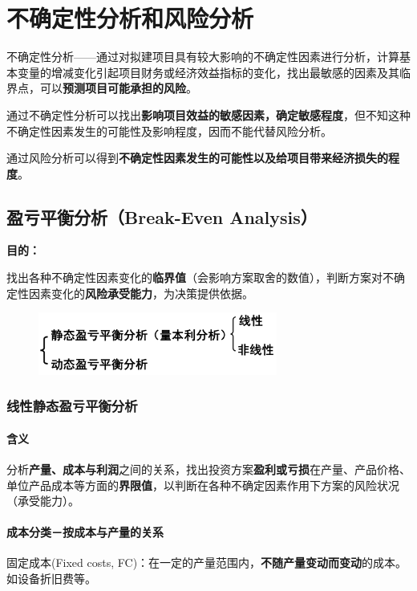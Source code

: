 \chapter{不确定性分析和风险分析}
不确定性分析——通过对拟建项目具有较大影响的不确定性因素进行分析，计算基本变量的增减变化引起项目财务或经济效益指标的变化，找出最敏感的因素及其临界点，可以\textbf{预测项目可能承担的风险}。

通过不确定性分析可以找出\textbf{影响项目效益的敏感因素，确定敏感程度}，但不知这种不确定性因素发生的可能性及影响程度，因而不能代替风险分析。

通过风险分析可以得到\textbf{不确定性因素发生的可能性以及给项目带来经济损失的程度}。

\section{盈亏平衡分析（Break-Even Analysis）}
\noindent\textbf{目的：}

找出各种不确定性因素变化的\textbf{临界值}（会影响方案取舍的数值），判断方案对不确定性因素变化的\textbf{风险承受能力}，为决策提供依据。

\begin{figure}[H]
    \centering
    \includegraphics[width=0.7\textwidth]{image/盈亏平衡分析-种类.png}
    \label{fig:19}
\end{figure}

\subsection{线性静态盈亏平衡分析}
\subsubsection{含义}
分析\textbf{产量、成本与利润}之间的关系，找出投资方案\textbf{盈利或亏损}在产量、产品价格、单位产品成本等方面的\textbf{界限值}，以判断在各种不确定因素作用下方案的风险状况（承受能力）。

\subsubsection{成本分类－按成本与产量的关系}
固定成本(Fixed costs, FC)：在一定的产量范围内，\textbf{不随产量变动而变动}的成本。如设备折旧费等。

